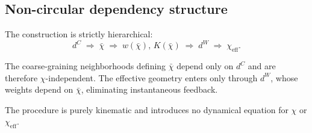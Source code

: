 \subsection{Non-circular dependency structure}
  \label{subsec:non-circular-dependency-structure}

  The construction is strictly hierarchical:
  \[
    d^{C}
    \;\Longrightarrow\;
    \bar{\chi}
    \;\Longrightarrow\;
    w(\bar{\chi}),\,K(\bar{\chi})
    \;\Longrightarrow\;
    d^{W}
    \;\Longrightarrow\;
    \chi_{\mathrm{eff}}.
  \]

  The coarse-graining neighborhoods defining $\bar{\chi}$ depend
  only on $d^{C}$ and are therefore $\chi$-independent.
  The effective geometry enters only through $d^{W}$, whose weights
  depend on $\bar{\chi}$, eliminating instantaneous feedback.

  The procedure is purely kinematic and introduces no dynamical
  equation for $\chi$ or $\chi_{\mathrm{eff}}$.
